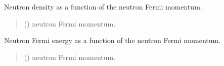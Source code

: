 \documentclass[letterpaper,10pt,english]{sphinxmanual}
\begin{document}

\begin{fulllineitems}
\label{\detokenize{source/api/setup_eos_ffg:nucleardatapy.eos.setup_ffg.den_n}}
\pysigstartsignatures
{}
\pysigstopsignatures
\sphinxAtStartPar
Neutron density as a function of the neutron Fermi momentum.
\begin{quote}\begin{description}
\sphinxAtStartPar
{} () \textendash{} neutron Fermi momentum.

\end{description}\end{quote}

\end{fulllineitems}


\begin{fulllineitems}
\label{\detokenize{source/api/setup_eos_ffg:nucleardatapy.eos.setup_ffg.eF_n}}
\pysigstartsignatures
{}
\pysigstopsignatures
\sphinxAtStartPar
Neutron Fermi energy as a function of the neutron Fermi momentum.
\begin{quote}\begin{description}
\sphinxAtStartPar
{} () \textendash{} neutron Fermi momentum.

\end{description}\end{quote}

\end{fulllineitems}
\end{document}
